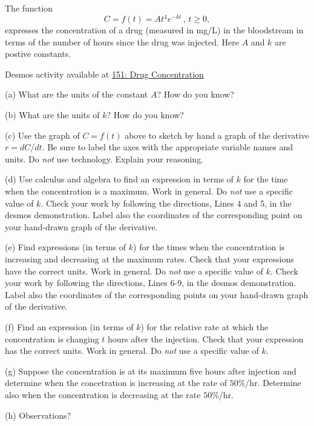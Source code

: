 \documentclass{ximera}
\begin{document}
\begin{question}  \label{Q:ds45t45ty}
The function 
\[
     C = f(t) = A t^4 e^{-kt} \, , \, t\geq 0, 
\]
expresses the concentration of a drug (measured in mg/L) in the bloodstream in terms of the number of hours since the drug was injected. Here $A$ and $k$ are postive constants. 

\begin{onlineOnly}
    \begin{center}
\end{center}
\end{onlineOnly}

Desmos activity available at \href{https://www.desmos.com/calculator/lvsxu3wa9a}{151: Drug Concentration}

(a) What are the units of the constant $A$? How do you know?

(b) What are the units of $k$? How do you know?

(c) Use the graph of $C=f(t)$ above to sketch by hand a graph of the derivative $r=dC/dt$. Be sure to label the axes with the appropriate variable names and units. Do \emph{not} use technology. Explain your reasoning.

(d) Use calculus and algebra to find an expression in terms of $k$ for the time when the concentration is a maximum. Work in general. Do \emph{not} use a specific value of $k$. Check your work by following the directions, Lines 4 and 5, in the desmos demonstration. Label also the coordinates of the corresponding point on your hand-drawn graph of the derivative.

(e) Find expressions (in terms of $k$) for the times when the concentration is increasing and decreasing at the maximum rates. Check that your expressions have the correct units. Work in general. Do \emph{not} use a specific value of $k$. Check your work by following the directions, Lines 6-9, in the desmos demonstration. Label also the coordinates of the corresponding points on your hand-drawn graph of the derivative.


(f) Find an expression (in terms of $k$) for the relative rate at which the concentration is changing $t$ hours after the injection. Check that your expression has the correct units. Work in general. Do \emph{not} use a specific value of $k$. 

(g) Suppose the concentration is at its maximum five hours after injection and determine when the concetration is increasing at the rate of $50\%$/hr. Determine also when the concentration is decreasing at the rate $50\%$/hr.




(h) Observations?

\end{question}
\end{document}
